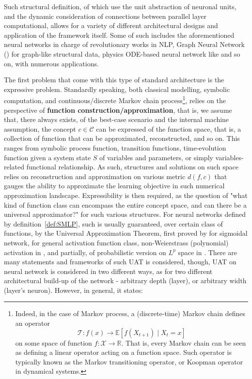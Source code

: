Such structural definition, of which use the unit abstraction of neuronal units, and the dynamic consideration of connections between parallel layer computational, allows for a variety of different architectural designs and application of the framework itself. Some of such includes the aforementioned neural networks in charge of revolutionary works in NLP, Graph Neural Network (\cite{Oono2020Graph,Scar04,GRP_Hamilton}) for graph-like structural data, physics ODE-based neural network like \cite{chen2019neuralordinarydifferentialequations} and so on, with numerous applications. 

The first problem that come with this type of standard architecture is the expressive problem. Standardly speaking, both classical modelling, symbolic computation, and continuous/discrete Markov chain process\footnote{Indeed, in the case of Markov process, a (discrete-time) Markov chain defines an operator \begin{equation*}
    \mathcal{T}: f(x) \to \mathbb{E}[f(X_{t+1})\mid X_{t}=x]
\end{equation*} on some space of function $f:\mathcal{X}\to\mathbb{R}$. That is, every Markov chain can be seen as defining a linear operator acting on a function space. Such operator is typically known as the Markov transitioning operator, or Koopman operator in dynamical systems.}, relies on the perspective of \textbf{function construction/approximation}, that is, we assume that, there always exists, of the best-case scenario and the internal machine assumption, the concept $c\in\mathcal{C}$ can be expressed of the function space, that is, a collection of function that can be approximated, reconstructed, and so on. This ranges from symbolic process function, transition functions, time-evolution function given a system state $S$ of variables and parameters, or simply variables-related functional relationship. As such, structures and solutions on such space relies on reconstruction and approximation on various metric $d(f,c)$ that gauges the ability to approximate the learning objective in such numerical approximation landscape. Expressibility is then required, as the question of "what kind of function class can encompass the entire concept space, and can there be a universal approximator?" for such various structures. For neural networks defined by definition~\ref{def:SMLP}, such is usually guaranteed, over certain class of functions, by the Universal Approximation Theorem, first proved by \cite{cybenko1989approximation} for sigmoidal network, \cite{hornik1989multilayer} for general activation function class, non-Weierstrass (polynomial) activation in \cite{leshno1993multilayer}, and partially, of probabilistic version on $L^{p}$ space in \cite{hornik1991approximation}. There are many statements and frameworks of such UAT is considered, though, UAT on neural network is considered in two different ways, as for two different architectural build-up of the network - arbitrary depth (layer), or arbitrary width (layer's neuron). However, in general, it states:

